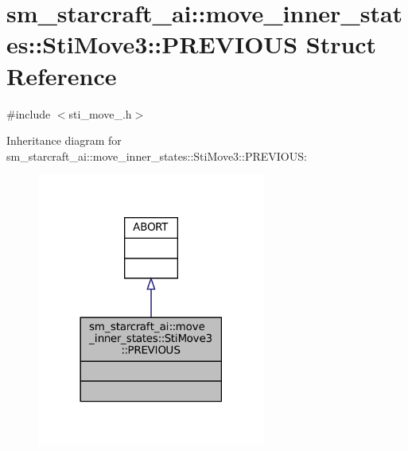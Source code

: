 \hypertarget{structsm__starcraft__ai_1_1move__inner__states_1_1StiMove3_1_1PREVIOUS}{}\section{sm\+\_\+starcraft\+\_\+ai\+:\+:move\+\_\+inner\+\_\+states\+:\+:Sti\+Move3\+:\+:P\+R\+E\+V\+I\+O\+US Struct Reference}
\label{structsm__starcraft__ai_1_1move__inner__states_1_1StiMove3_1_1PREVIOUS}


{\ttfamily \#include $<$sti\+\_\+move\+\_.\+h$>$}



Inheritance diagram for sm\+\_\+starcraft\+\_\+ai\+:\+:move\+\_\+inner\+\_\+states\+:\+:Sti\+Move3\+:\+:P\+R\+E\+V\+I\+O\+US\+:
\nopagebreak
\begin{figure}[H]
\begin{center}
\leavevmode
\includegraphics[width=213pt]{structsm__starcraft__ai_1_1move__inner__states_1_1StiMove3_1_1PREVIOUS__inherit__graph}
\end{center}
\end{figure}


